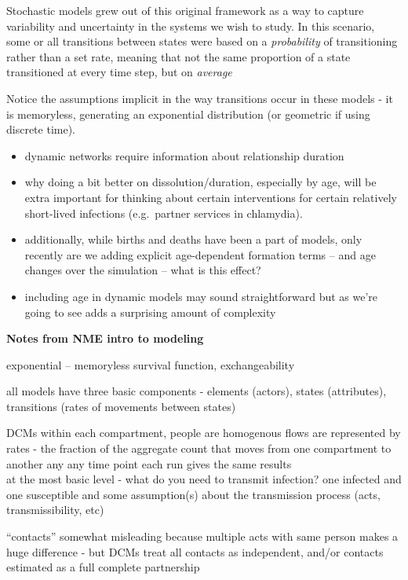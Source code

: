 \documentclass [11pt, proquest] {uwthesis}[2015/03/03]
\begin{document}
Stochastic models grew out of this original framework as a way to
capture variability and uncertainty in the systems we wish to study. In
this scenario, some or all transitions between states were based on a
\emph{probability} of transitioning rather than a set rate, meaning that
not the same proportion of a state transitioned at every time step, but
on \emph{average}

Notice the assumptions implicit in the way transitions occur in these
models - it is memoryless, generating an exponential distribution (or
geometric if using discrete time).
\begin{itemize}
\item
  dynamic networks require information about relationship duration
\item
  why doing a bit better on dissolution/duration, especially by age,
  will be extra important for thinking about certain interventions for
  certain relatively short-lived infections (e.g.~partner services in
  chlamydia).
\item
  additionally, while births and deaths have been a part of models, only
  recently are we adding explicit age-dependent formation terms -- and
  age changes over the simulation -- what is this effect?\\
\item
  including age in dynamic models may sound straightforward but as we're
  going to see adds a surprising amount of complexity
\end{itemize}
\textbf{Notes from NME intro to modeling}

exponential -- memoryless survival function, exchangeability

all models have three basic components - elements (actors), states
(attributes), transitions (rates of movements between states)

DCMs within each compartment, people are homogenous flows are
represented by rates - the fraction of the aggregate count that moves
from one compartment to another any any time point each run gives the
same results\\
at the most basic level - what do you need to transmit infection? one
infected and one susceptible and some assumption(s) about the
transmission process (acts, transmissibility, etc)

``contacts'' somewhat misleading because multiple acts with same person
makes a huge difference - but DCMs treat all contacts as independent,
and/or contacts estimated as a full complete partnership
\end{document}
